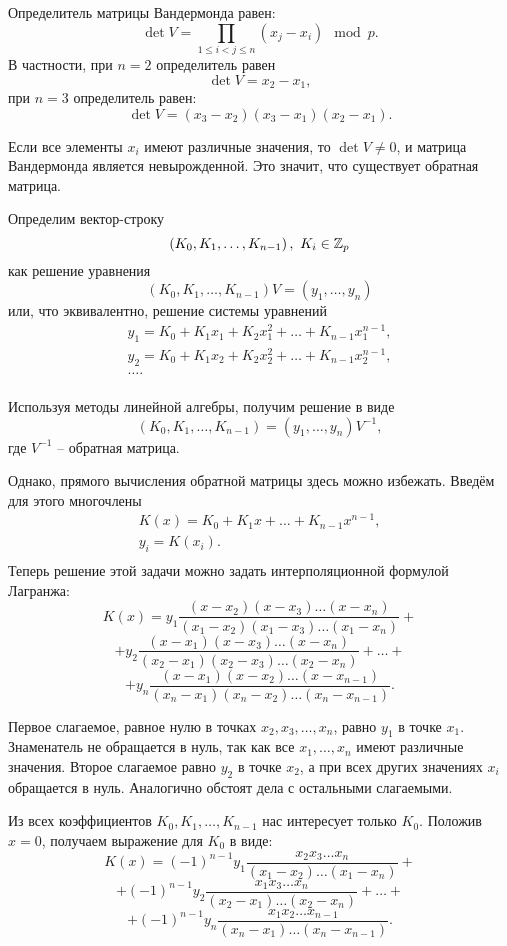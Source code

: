 Определитель матрицы Вандермонда равен:
    \[ \det V = \prod_{1\le i < j\le n} \left(x_j - x_i \right) \mod p. \]
В частности, при $n=2$ определитель равен
    \[ \det V = x_2 - x_1, \]
при $n=3$ определитель равен:
    \[ \det V = (x_3 - x_2) (x_3 - x_1) (x_2 - x_1). \]

Если все элементы $x_{i}$ имеют различные значения, то $\det V \ne 0$, и матрица Вандермонда является невырожденной. Это значит, что существует обратная матрица.

Определим вектор-строку
    \[ \left(K_{0}, K_{1}, \ldots, K_{n-1}\right), ~ K_{i} \in \mathbb{Z}_{p} \]
как решение уравнения
    \[ (K_{0} ,K_{1} , \ldots, K{}_{n-1} )V=(y_{1} , \ldots, y_{n} ) \]
или, что эквивалентно, решение системы уравнений
\[ \begin{array}{l}
    y_1 = K_0 + K_1 x_1 + K_2 x_1^2 + \dots + K_{n-1} x_1^{n-1}, \\
    y_2 = K_0 + K_1 x_2 + K_2 x_2^2 + \dots + K_{n-1} x_2^{n-1}, \\
    \dots.\\
\end{array} \]

Используя методы линейной алгебры, получим решение в виде
    \[ (K_{0} ,K_{1} , \ldots, K_{n-1} )=(y_{1} , \ldots, y_{n} )V^{-1}, \]
где $V^{-1}$ -- обратная матрица.

Однако, прямого вычисления обратной матрицы здесь можно избежать. Введём для этого многочлены
\[ \begin{array}{c}
    K(x)= K_{0} +K_{1} x+ \ldots +K_{n-1} x^{n-1}, \\
    y_{i} =K(x_{i}). \\
\end{array} \]
Теперь решение этой задачи можно задать интерполяционной формулой Лагранжа:
\[
    K(x) = y_1 \frac{(x - x_2)(x - x_3) \dots (x - x_n)} {(x_1-x_2)(x_1-x_3) \dots (x_1-x_n)} +
\] \[
    + y_2 \frac{(x-x_1)(x-x_3) \dots (x-x_n)} {(x_2-x_1)(x_2-x_3) \dots (x_2-x_n)} + \dots +
\] \[
    + y_n \frac{(x-x_1)(x-x_2) \dots (x-x_{n-1})} {(x_n-x_1)(x_n-x_2) \dots (x_n-x_{n-1})}.
\]

Первое слагаемое, равное нулю в точках $x_2, x_3, \dots, x_n$, равно $y_1$ в точке $x_1$. Знаменатель не обращается в нуль, так как все $x_1, \dots, x_n$ имеют различные значения. Второе слагаемое равно $y_2$ в точке $x_2$, а при всех других значениях $x_i$ обращается в нуль. Аналогично обстоят дела с остальными слагаемыми.

Из всех коэффициентов $K_0, K_1, \dots, K_{n-1}$ нас интересует только $K_0$.
Положив $x=0$, получаем выражение для $K_{0} $ в виде:
\[
    K(x) = (-1)^{n-1} y_1 \frac{x_2 x_3 \dots x_n} {(x_1-x_2) \dots (x_1-x_n)} +
\] \[
    + (-1)^{n-1} y_2 \frac{x_1 x_3 \dots x_n} {(x_2-x_1) \dots (x_2-x_n)} + \dots +
\] \[
    + (-1)^{n-1} y_n \frac{x_1 x_2 \dots x_{n-1}} {(x_n-x_1) \dots (x_n-x_{n-1})}.
\]

